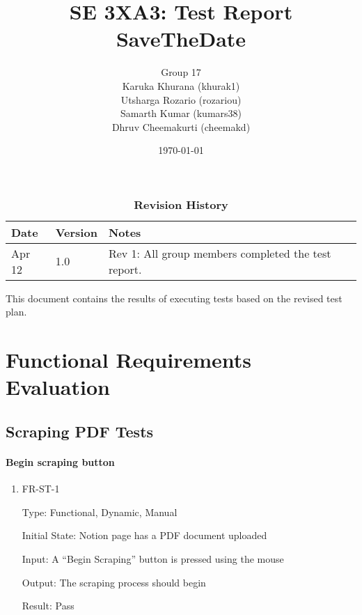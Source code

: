 \documentclass[12pt, titlepage]{article}
\title{SE 3XA3: Test Report\\SaveTheDate}
\author{Group 17\\
	Karuka Khurana (khurak1)\\
	Utsharga Rozario (rozariou)\\
	Samarth Kumar (kumars38)\\
	Dhruv Cheemakurti (cheemakd)\\
}
\date{\today}
\begin{document}
\maketitle

\tableofcontents
\listoftables

\newpage 

\begin{table}[tp]
\caption{\bf Revision History}
\begin{tabularx}{\textwidth}{p{3cm}p{2cm}X}
\toprule {\bf Date} & {\bf Version} & {\bf Notes}\\
\midrule
Apr 12 & 1.0 & Rev 1: All group members completed the test report.\\
\bottomrule
\end{tabularx}
\end{table}

\newpage


This document contains the results of executing tests based on the revised test plan.

\section{Functional Requirements Evaluation}

\subsection{Scraping PDF Tests}
		
\paragraph{Begin scraping button}

\begin{enumerate}

\item{FR-ST-1\\}

Type: Functional, Dynamic, Manual 

Initial State: Notion page has a PDF document uploaded 

Input: A “Begin Scraping” button is pressed using the mouse 

Output: The scraping process should begin 

Result: Pass

\end{enumerate}
\end{document}
